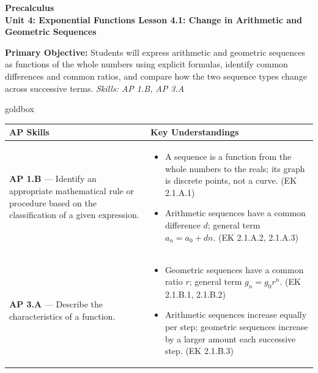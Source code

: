 \documentclass[10pt]{article}
\newcommand{\CourseName}{Precalculus}
\newcommand{\UnitNumberName}{Unit 4: Exponential Functions \quad}
\newcommand{\LessonNumberName}{Lesson 4.1: Change in Arithmetic and Geometric Sequences}
\begin{document}
\begin{center}
    {\Large\bfseries \CourseName \\
    {\small\bfseries \UnitNumberName \LessonNumberName}}
\end{center}

\begin{tcolorbox}[colback=sky, colframe=navy, boxrule=0.9pt, arc=2mm,
    left=2mm, right=2mm, top=1.5mm, bottom=1.5mm]
    \textbf{Primary Objective:} Students will express arithmetic and geometric sequences as
    functions of the whole numbers using explicit formulas, identify common differences and
    common ratios, and compare how the two sequence types change across successive terms.
    \hfill\textit{\small Skills: AP 1.B, AP 3.A}
\end{tcolorbox}

\renewcommand{\arraystretch}{1.6}
\begin{skillbox}{goldbox}
\begin{tabularx}{\linewidth}{@{}X X@{}}
\textbf{AP Skills} &
\textbf{Key Understandings} \\
\midrule
\textbf{AP 1.B} --- Identify an appropriate mathematical rule or procedure based on the
classification of a given expression. &
\begin{itemize}[leftmargin=1.2em,itemsep=2pt,topsep=0pt]
  \item A sequence is a function from the whole numbers to the reals; its graph is discrete
        points, not a curve. (EK 2.1.A.1)
  \item Arithmetic sequences have a common difference $d$; general term $a_n = a_0 + dn$.
        (EK 2.1.A.2, 2.1.A.3)
\end{itemize} \\
\textbf{AP 3.A} --- Describe the characteristics of a function. &
\begin{itemize}[leftmargin=1.2em,itemsep=2pt,topsep=0pt]
  \item Geometric sequences have a common ratio $r$; general term $g_n = g_0 r^n$.
        (EK 2.1.B.1, 2.1.B.2)
  \item Arithmetic sequences increase equally per step; geometric sequences increase by a
        larger amount each successive step. (EK 2.1.B.3)
\end{itemize} \\
\end{tabularx}
\end{skillbox}
\end{document}
